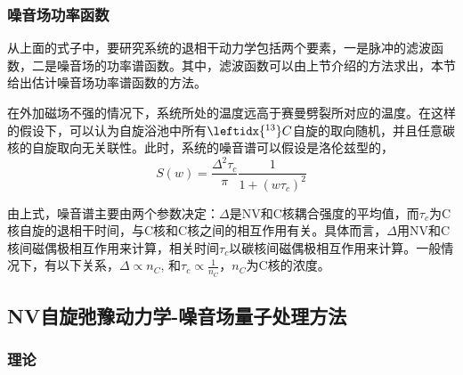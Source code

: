 \subsubsection{噪音场功率函数}
从上面的式子中，要研究系统的退相干动力学包括两个要素，一是脉冲的滤波函数，二是噪音场的功率谱函数。其中，滤波函数可以由上节介绍的方法求出，本节给出估计噪音场功率谱函数的方法。

在外加磁场不强的情况下，系统所处的温度远高于赛曼劈裂所对应的温度。在这样的假设下，可以认为自旋浴池中所有$\leftidx{^{13}} C$自旋的取向随机，并且任意碳核的自旋取向无关联性。此时，系统的噪音谱可以假设是洛伦兹型的，
\begin{equation}
    S(w)=\frac{\Delta^2 \tau_c}{\pi}\frac{1}{1+(w \tau_c)^2}
\end{equation}

由上式，噪音谱主要由两个参数决定：$\Delta$是NV和C核耦合强度的平均值，而$\tau_c$为C核自旋的退相干时间，与C核和C核之间的相互作用有关。具体而言，$\Delta$用NV和C核间磁偶极相互作用来计算，相关时间$\tau_c$以碳核间磁偶极相互作用来计算。一般情况下，有以下关系，$\Delta \propto n_{C} $, 和$\tau_c \propto \frac{1}{n_{C}}$，$n_C$为C核的浓度。

\subsection{NV自旋弛豫动力学-噪音场量子处理方法}
\subsubsection{理论}
